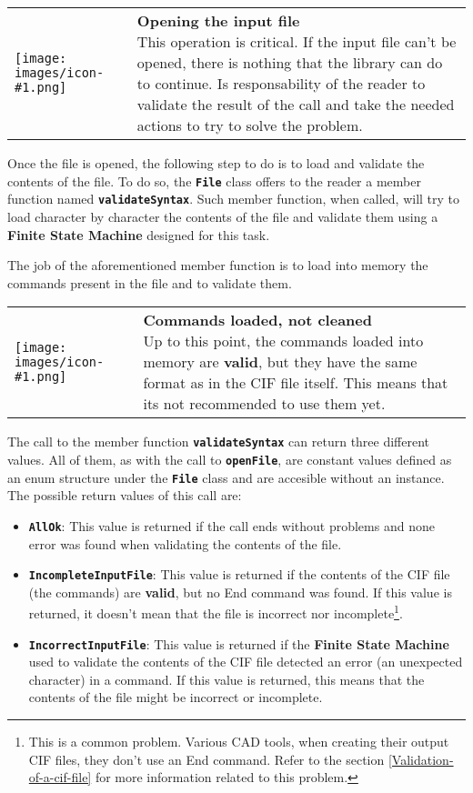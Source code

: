 \documentclass[11pt,twoside,openany,x11names,svgnames]{memoir}
\makeatletter
\newcommand{\IconNote}[3]
{
	\begin{table}[ht]
	\begin{tabular}{ lm{\dimexpr\textwidth-8\tabcolsep-\wd0}@{}}
		\toprule
		\texttt{[image: images/icon-\#1.png]}
		&
		\parbox[t]{155mm}{
		\textbf{#2} \\
		#3
		}
	\end{tabular}
\end{table}
}
\makeatother
\begin{document}
\IconNote
	{error}
	{Opening the input file}
	{This operation is critical. If the input file can't be opened, there is nothing that the library can do to continue. Is responsability of the reader to validate the result of the call and take the needed actions to try to solve the problem.}
	
Once the file is opened, the following step to do is to load and validate the contents of the file. To do so, the \textbf{\texttt{File}} class offers to the reader a member function named \textbf{\texttt{validateSyntax}}. Such member function, when called, will try to load character by character the contents of the file and validate them using a \textbf{Finite State Machine} designed for this task.

The job of the aforementioned member function is to load into memory the commands present in the file and to validate them. 

\IconNote
	{warning}
	{Commands loaded, not cleaned}
	{Up to this point, the commands loaded into memory are \textbf{valid}, but they have the same format as in the CIF file itself. This means that its not recommended to use them yet.}
	
The call to the member function \textbf{\texttt{validateSyntax}} can return three different values. All of them, as with the call to \textbf{\texttt{openFile}}, are constant values defined as an enum structure under the \textbf{\texttt{File}} class and are accesible without an instance. The possible return values of this call are:

\begin{itemize}
	\item \textbf{\texttt{AllOk}}: This value is returned if the call ends without problems and none error was found when validating the contents of the file.
	
	\item \textbf{\texttt{IncompleteInputFile}}: This value is returned if the contents of the CIF file (the commands) are \textbf{valid}, but no End command was found. If this value is returned, it doesn't mean that the file is incorrect nor incomplete\footnote{This is a common problem. Various CAD tools, when creating their output CIF files, they don't use an End command. Refer to the section \ref{Validation-of-a-cif-file} for more information related to this problem.}.
	
	\item \textbf{\texttt{IncorrectInputFile}}: This value is returned if the \textbf{Finite State Machine} used to validate the contents of the CIF file detected an error (an unexpected character) in a command. If this value is returned, this means that the contents of the file might be incorrect or incomplete.
\end{itemize}
\end{document}
